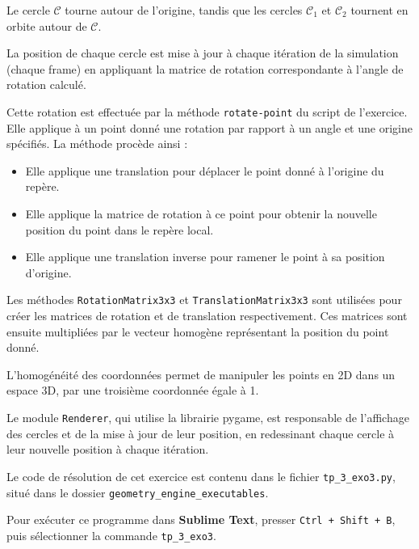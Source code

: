 \documentclass[a4paper,12pt]{article}
\begin{document}
Le cercle $\mathcal{C}$ tourne autour de l'origine, tandis que les cercles $\mathcal{C}_1$ et $\mathcal{C}_2$ tournent en orbite autour de $\mathcal{C}$.

La position de chaque cercle est mise à jour à chaque itération de la simulation (chaque frame) en appliquant la matrice de rotation correspondante à l'angle de rotation calculé.

Cette rotation est effectuée par la méthode \texttt{rotate-point} du script de l'exercice. 
Elle applique à un point donné une rotation par rapport à un angle et une origine spécifiés. La méthode procède ainsi :

\begin{itemize}
    \item Elle applique une translation pour déplacer le point donné à l'origine du repère.
    \item Elle applique la matrice de rotation à ce point pour obtenir la nouvelle position du point dans le repère local.
    \item Elle applique une translation inverse pour ramener le point à sa position d'origine.
\end{itemize}

Les méthodes \texttt{RotationMatrix3x3} et \texttt{TranslationMatrix3x3} sont utilisées pour créer les matrices de rotation et de translation respectivement. 
Ces matrices sont ensuite multipliées par le vecteur homogène représentant la position du point donné.

L'homogénéité des coordonnées permet de manipuler les points en 2D dans un espace 3D, par une troisième coordonnée égale à 1.

Le module \texttt{Renderer}, qui utilise la librairie pygame, est responsable de l'affichage des cercles et de la mise à jour de leur position, en redessinant chaque cercle à leur nouvelle position à chaque itération.

Le code de résolution de cet exercice est contenu dans le fichier \texttt{tp\_3\_exo3.py}, situé dans le dossier \texttt{geometry\_engine\_executables}.

Pour exécuter ce programme dans \textbf{Sublime Text}, presser \texttt{Ctrl + Shift + B}, puis sélectionner la commande \texttt{tp\_3\_exo3}.
\end{document}
